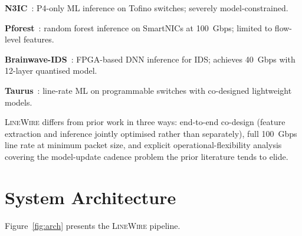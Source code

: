 \documentclass[sigconf,nonacm]{acmart}
\begin{document}
\textbf{N3IC}~\cite{siracusano2023n3ic}: P4-only ML inference on Tofino
switches; severely model-constrained.

\textbf{Pforest}~\cite{xiong2024pforest}: random forest inference on
SmartNICs at 100~Gbps; limited to flow-level features.

\textbf{Brainwave-IDS}~\cite{nakahara2024hwml}: FPGA-based DNN inference
for IDS; achieves 40~Gbps with 12-layer quantised model.

\textbf{Taurus}~\cite{shao2025taurus}: line-rate ML on programmable
switches with co-designed lightweight models.

\textsc{LineWire} differs from prior work in three ways: end-to-end
co-design (feature extraction and inference jointly optimised rather
than separately), full 100~Gbps line rate at minimum packet size, and
explicit operational-flexibility analysis covering the model-update
cadence problem the prior literature tends to elide.

\section{System Architecture}

Figure~\ref{fig:arch} presents the \textsc{LineWire} pipeline.
\end{document}
